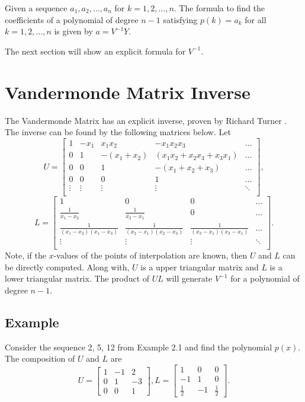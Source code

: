\documentclass[12pt]{amsart}
\begin{document}
\begin{theorem}
Given a sequence $a_1, a_2,\hdots,a_n$ for $k=1, 2,\hdots, n$. The formula to find the coefficients of a polynomial of degree $n-1$ satisfying $p(k)=a_k$ for all $k=1, 2,\hdots, n$ is given by $a=V^{-1}Y$.
\end{theorem}
The next section will show an explicit formula for $V^{-1}$.
\section{Vandermonde Matrix Inverse}
The Vandermonde Matrix has an explicit inverse, proven by Richard Turner \cite{Turner}. The inverse can be found by the following matrices below. Let
\begin{equation*}
U=
\left[ {\begin{array}{ccccc}
1& -x_1 &x_1x_2&-x_1x_2x_3&\hdots \\
0&1&-(x_1+x_2)&(x_1x_2+x_2x_3+x_3x_1)&\hdots \\
0&0&1&-(x_1+x_2+x_3)&\hdots \\
0&0&0&1&\hdots\\
\vdots&\vdots&\vdots&\vdots&\ddots\\
\end{array} } \right],
\end{equation*}
\begin{equation*}
L=
\left[ {\begin{array}{cccc}
1& 0 &0&\hdots \\
\frac{1}{x_1-x_2} &\frac{1}{x_2-x_1}&0&\hdots \\
\frac{1}{(x_1-x_2)(x_1-x_3)} & \frac{1}{(x_2-x_1)(x_2-x_3)}&\frac{1}{(x_3-x_1)(x_3-x_1)}&\hdots \\
\vdots&\vdots&\vdots&\ddots\\
\end{array} } \right].
\end{equation*}
Note, if the $x$-values of the points of interpolation are known, then $U$ and $L$ can be directly computed. Along with, $U$ is a upper triangular matrix and $L$ is a lower triangular matrix. The product of $UL$ will generate $V^{-1}$ for a polynomial of degree $n-1$.
\subsection{Example} Consider the sequence 2, 5, 12 from Example 2.1 and find the polynomial $p(x)$. The composition of $U$ and $L$ are
\begin{equation*}
U=
\left[ {\begin{array}{ccc}
1&-1&2 \\
0&1&-3\\
0&0&1
\end{array} } \right],
L=
\left[ {\begin{array}{ccc}
1&0&0 \\
-1&1&0 \\
\frac{1}{2}&-1&\frac{1}{2}
\end{array} } \right].
\end{equation*}
 
\end{document}
